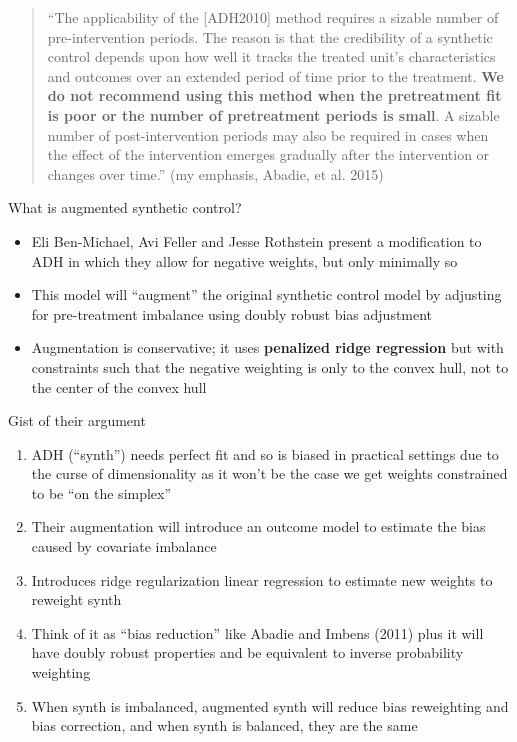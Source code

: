 \documentclass{beamer}
\begin{document}
\begin{frame}

\begin{quote}
``The applicability of the [ADH2010] method requires a sizable number of pre-intervention periods. The reason is that the credibility of a synthetic control depends upon how well it tracks the treated unit’s characteristics and outcomes over an extended period of time prior to the treatment. \textbf{We do not recommend using this method when the pretreatment fit is poor or the number of pretreatment periods is small}. A sizable number of post-intervention periods may also be required in cases when the effect of the intervention emerges gradually after the intervention or changes over time.'' (my emphasis, Abadie, et al. 2015)
\end{quote}

\end{frame}

\begin{frame}{What is augmented synthetic control?}

\begin{itemize}
\item Eli Ben-Michael, Avi Feller and Jesse Rothstein present a modification to ADH in which they allow for negative weights, but only minimally so
\item This model will ``augment'' the original synthetic control model by adjusting for pre-treatment imbalance using doubly robust bias adjustment 
\item Augmentation is conservative; it uses \textbf{penalized ridge regression} but with constraints such that the negative weighting is only to the convex hull, not to the center of the convex hull
\end{itemize}

\end{frame}




\begin{frame}{Gist of their argument}

\begin{enumerate}
\item ADH (``synth'') needs perfect fit and so is biased in practical settings due to the curse of dimensionality as it won't be the case we get weights constrained to be ``on the simplex''
\item Their augmentation will introduce an outcome model to estimate the bias caused by covariate imbalance 
\item Introduces ridge regularization linear regression to estimate new weights to reweight synth
\item Think of it as ``bias reduction'' like Abadie and Imbens (2011) plus it will have doubly robust properties and be equivalent to inverse probability weighting
\item When synth is imbalanced, augmented synth will reduce bias reweighting and bias correction, and when synth is balanced, they are the same
\end{enumerate}

\end{frame}
\end{document}
